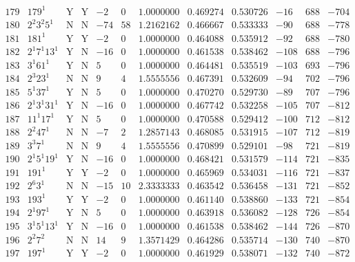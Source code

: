 \documentclass[11pt,reqno,a4letter]{article}
\numberwithin{figure}{section}
\numberwithin{table}{section}
\theoremstyle{plain}
\numberwithin{theorem}{section}
\theoremstyle{definition}
\begin{document}
\begin{table}[h!]
\begin{equation*}
{\begin{array}{cc|cc|ccc|cc|ccc}
 179 & 179^1 & \text{Y} & \text{Y} & -2 & 0 & 1.0000000 & 0.469274 & 0.530726 & -16 & 688 & -704 \\
 180 & 2^2 3^2 5^1 & \text{N} & \text{N} & -74 & 58 & 1.2162162 & 0.466667 & 0.533333 & -90 & 688 & -778 \\
 181 & 181^1 & \text{Y} & \text{Y} & -2 & 0 & 1.0000000 & 0.464088 & 0.535912 & -92 & 688 & -780 \\
 182 & 2^1 7^1 13^1 & \text{Y} & \text{N} & -16 & 0 & 1.0000000 & 0.461538 & 0.538462 & -108 & 688 & -796 \\
 183 & 3^1 61^1 & \text{Y} & \text{N} & 5 & 0 & 1.0000000 & 0.464481 & 0.535519 & -103 & 693 & -796 \\
 184 & 2^3 23^1 & \text{N} & \text{N} & 9 & 4 & 1.5555556 & 0.467391 & 0.532609 & -94 & 702 & -796 \\
 185 & 5^1 37^1 & \text{Y} & \text{N} & 5 & 0 & 1.0000000 & 0.470270 & 0.529730 & -89 & 707 & -796 \\
 186 & 2^1 3^1 31^1 & \text{Y} & \text{N} & -16 & 0 & 1.0000000 & 0.467742 & 0.532258 & -105 & 707 & -812 \\
 187 & 11^1 17^1 & \text{Y} & \text{N} & 5 & 0 & 1.0000000 & 0.470588 & 0.529412 & -100 & 712 & -812 \\
 188 & 2^2 47^1 & \text{N} & \text{N} & -7 & 2 & 1.2857143 & 0.468085 & 0.531915 & -107 & 712 & -819 \\
 189 & 3^3 7^1 & \text{N} & \text{N} & 9 & 4 & 1.5555556 & 0.470899 & 0.529101 & -98 & 721 & -819 \\
 190 & 2^1 5^1 19^1 & \text{Y} & \text{N} & -16 & 0 & 1.0000000 & 0.468421 & 0.531579 & -114 & 721 & -835 \\
 191 & 191^1 & \text{Y} & \text{Y} & -2 & 0 & 1.0000000 & 0.465969 & 0.534031 & -116 & 721 & -837 \\
 192 & 2^6 3^1 & \text{N} & \text{N} & -15 & 10 & 2.3333333 & 0.463542 & 0.536458 & -131 & 721 & -852 \\
 193 & 193^1 & \text{Y} & \text{Y} & -2 & 0 & 1.0000000 & 0.461140 & 0.538860 & -133 & 721 & -854 \\
 194 & 2^1 97^1 & \text{Y} & \text{N} & 5 & 0 & 1.0000000 & 0.463918 & 0.536082 & -128 & 726 & -854 \\
 195 & 3^1 5^1 13^1 & \text{Y} & \text{N} & -16 & 0 & 1.0000000 & 0.461538 & 0.538462 & -144 & 726 & -870 \\
 196 & 2^2 7^2 & \text{N} & \text{N} & 14 & 9 & 1.3571429 & 0.464286 & 0.535714 & -130 & 740 & -870 \\
 197 & 197^1 & \text{Y} & \text{Y} & -2 & 0 & 1.0000000 & 0.461929 & 0.538071 & -132 & 740 & -872 \\

\end{array}}
\end{equation*}
\end{table}
\end{document}
